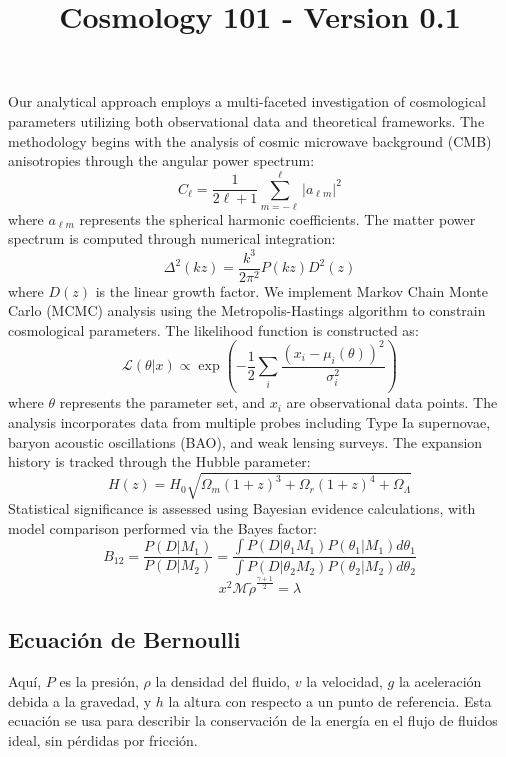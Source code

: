 \documentclass{article}\usepackage{graphicx} \usepackage{amsmath} \usepackage{colortbl}\title{Cosmology 101 - Version 0.1}
\begin{document}
Our analytical approach employs a multi-faceted investigation of cosmological parameters utilizing both observational data and theoretical frameworks. The methodology begins with the analysis of cosmic microwave background (CMB) anisotropies through the angular power spectrum:  
\begin{equation} C_\ell = \frac{1}{2\ell + 1}\sum_{m=-\ell}^{\ell} |a_{\ell m}|^2 
\end{equation}  
where $a_{\ell m}$ represents the spherical harmonic coefficients. The matter power spectrum is computed through numerical integration:  \begin{equation} \Delta^2(k z) = \frac{k^3}{2\pi^2}P(k z)D^2(z) 
\end{equation}  
where $D(z)$ is the linear growth factor. We implement Markov Chain Monte Carlo (MCMC) analysis using the Metropolis-Hastings algorithm to constrain cosmological parameters. The likelihood function is constructed as:  
\begin{equation} 
\mathcal{L}(\theta|x) \propto \exp\left(-\frac{1}{2}\sum_i \frac{(x_i - \mu_i(\theta))^2}{\sigma_i^2}\right) 
\end{equation}  
where $\theta$ represents the parameter set, and $x_i$ are observational data points. The analysis incorporates data from multiple probes including Type Ia supernovae, baryon acoustic oscillations (BAO), and weak lensing surveys. The expansion history is tracked through the Hubble parameter:  
\begin{equation} H(z) = H_0\sqrt{\Omega_m(1+z)^3 + \Omega_r(1+z)^4 + \Omega_\Lambda} 
\end{equation}  
Statistical significance is assessed using Bayesian evidence calculations, with model comparison performed via the Bayes factor:  \begin{equation} B_{12} = \frac{P(D|M_1)}{P(D|M_2)} = \frac{\int P(D|\theta_1 M_1)P(\theta_1|M_1)d\theta_1}{\int P(D|\theta_2 M_2)P(\theta_2|M_2)d\theta_2} 
\end{equation} \begin{equation}x^2 \mathcal{M} \tilde{\rho }^{\frac{\gamma +1}{2}}=\lambda \label{ber1} \end{equation}\subsection{Ecuaci{\'o}n de Bernoulli}
Aquí, $P$ es la presión, $\rho$ la densidad del fluido, $v$ la velocidad, $g$ la aceleración debida a la gravedad, y $h$ la altura con respecto a un punto de referencia. Esta ecuaci{\'o}n se usa para describir la conservación de la energía en el flujo de fluidos ideal, sin pérdidas por fricción.
\end{document}
